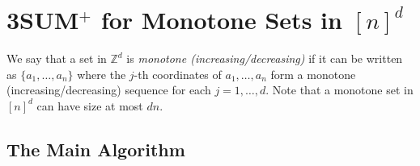 \documentclass[11pt]{article}
\newcommand{\Z}{\mathbb{Z}}
\newcommand{\IGNORE}[1]{}
\newcommand{\polylog}{\rm{polylog}}
\begin{document}
\IGNORE{
\noindent
{\bf Proof outline:}

First we can replace $Z\times Z$ with $Z$, by mapping
  $(a_1,a_2)$ to $Ma_1+a_2$ for a sufficiently large $M$.

  Use a small number of "nearly additive" hash functions
  $h_j:Z \rightarrow [O(N \polylog N)]$
  (e.g., $h_j(a) = a \mod p_j$ for some random prime $p_j$, or
  the hash function from the Baran-Demaine-Patrascu 3SUM paper). NEEDS MORE WORK.

  For each $j$, multiply the polynomials
  $\sum_{a \in A} x^{h_j(a)}$ and $\sum_{b \in B} x^{h_j(b)}$ with a sparse convolution.

  A sparse convolution is a convolution whose input has a high number of zero values. Hence, the input is represented as a list of the non-zero values, and its size $O(n)$ = the number of non-zero values. The size of the (non-zero) output is denoted by $k$. Cole and Hariharan~\cite{CH02} claimed a randomized algorithm that runs in time $\tilde{O}(k)$ yielding the desired.

  In Section~\ref{determinstic-algo} we show our claim for the deterministic case. We point out that a weaker deterministic result that runs in $O(n^2)$ time~\cite{AKP07} existed previously. AMIR-PORAT DO NOT REALLY NEED T, IS IT COMPARABLE?
  \qed

}










\section{3SUM$^+$ for Monotone Sets in $[n]^d$}\label{sec:mono}

We say that a set in $\Z^d$ is \emph{monotone (increasing/decreasing)}
if it can be written as $\{a_1,\ldots,a_n\}$ where
the $j$-th coordinates of
$a_1,\ldots,a_n$ form a monotone (increasing/decreasing) sequence
for each $j=1,\ldots,d$.
Note that a monotone set in $[n]^d$ can have size at most $dn$.


\subsection{The Main Algorithm}
\end{document}
